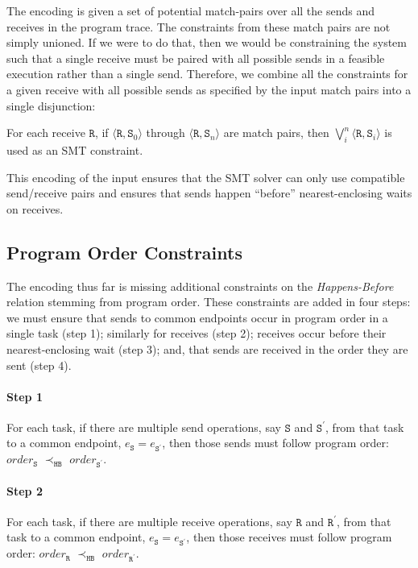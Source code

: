 The encoding is given a set of potential match-pairs over all the
sends and receives in the program trace. The constraints from these
match pairs are not simply unioned. If we were to do that, then we
would be constraining the system such that a single receive must be
paired with all possible sends in a feasible execution rather than a
single send. Therefore, we combine all the constraints for a given
receive with all possible sends as specified by the input match pairs
into a single disjunction:

\begin{definition}
For each receive $\mathtt{R}$, if $\langle\mathtt{R},
\mathtt{S}_0\rangle$ through $\langle\mathtt{R}, \mathtt{S}_n\rangle$
are match pairs, then $\bigvee_{i}^{n} \langle\mathtt{R},
\mathtt{S}_i\rangle$ is used as an SMT constraint.
\end{definition}

This encoding of the input ensures that the SMT solver can only use
compatible send/receive pairs and ensures that sends happen ``before''
nearest-enclosing waits on receives.

\subsection{Program Order Constraints}

The encoding thus far is missing
additional constraints on the \emph{Happens-Before} relation stemming from program order. These constraints are added in four steps: we must ensure that sends to common endpoints occur
in program order in a single task (step 1); similarly for receives
(step 2); receives occur before their nearest-enclosing wait (step 3);
and, that sends are received in the order they are sent (step 4).

\paragraph*{Step 1} For each task, if there are multiple send
operations, say $\mathtt{S}$ and $\mathtt{S^\prime}$, from that task
to a common endpoint, $e_\mathtt{S} = e_\mathtt{S^\prime}$, then those
sends must follow program order: $\mathit{order}_\mathtt{S}$
$\prec_\mathtt{HB}$ $\mathit{order}_\mathtt{S^\prime}$.

\paragraph*{Step 2} For each task, if there are multiple receive
operations, say $\mathtt{R}$ and $\mathtt{R^\prime}$, from that task
to a common endpoint, $e_\mathtt{S} = e_\mathtt{S^\prime}$, then those
receives must follow program order: $\mathit{order}_\mathtt{R}$
$\prec_\mathtt{HB}$ $\mathit{order}_\mathtt{R^\prime}$.

